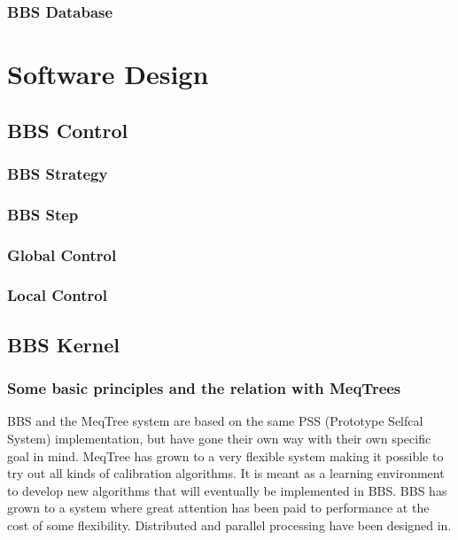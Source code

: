 \documentclass[10pt]{lofar}
\begin{document}
\subsubsection{BBS Database}
\label{subsubsec:interf-database}

\pagebreak

\section{Software Design}
\label{sec:software-design}

\subsection{BBS Control}
\label{subsec:design-control}

\subsubsection{BBS Strategy}
\label{subsubsec:design-strategy}

\subsubsection{BBS Step}
\label{subsubsec:design-step}

\subsubsection{Global Control}
\label{subsubsec:design-global-control}

\subsubsection{Local Control}
\label{subsubsec:design-local-control}


\subsection{BBS Kernel}
\label{subsec:design-kernel}
\subsubsection{Some basic principles and the relation with MeqTrees}
\label{subsubsec:design-principles}
BBS and the MeqTree system  are based on the same PSS (Prototype Selfcal System) implementation, but have gone their own way with their own specific goal in mind. MeqTree has grown to a very flexible system making it possible to try out all kinds of calibration algorithms. It is meant as a learning environment to develop new algorithms that will eventually be implemented in BBS. BBS has grown to a system where great attention has been paid to performance at the cost of some flexibility. Distributed and parallel processing have been designed in.
\end{document}
